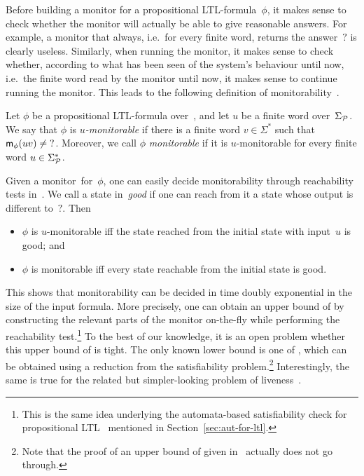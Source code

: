 \noindent
Before building a monitor for a propositional LTL-formula~$\phi$, it makes sense
to check whether the monitor will actually be able to give reasonable answers.
For example, a monitor that always, i.e.~for every finite word, returns the
answer~${?}$ is clearly useless.  Similarly, when running the monitor, it makes
sense to check whether, according to what has been seen of the system's
behaviour until now, i.e.~the finite word read by the monitor until now, it
makes sense to continue running the monitor.  This leads to the following
definition of monitorability~\cite{PnZa-FM06,FaFM-RV09,Bau-CoRR10}.

\begin{definition}[Monitorability]\label{def:monitorability-ltl}
    Let $\phi$ be a propositional LTL-formula over~\Pmc, and let $u$ be a finite
    word over~$\Sigma_\mathcal{P}$.  We say that $\phi$ is \emph{$u$-monitorable} if
    there is a finite word $v\in\Sigma^*$ such that $\mathsf{m}_\phi(uv)\ne{?}$.
    Moreover, we call $\phi$ \emph{monitorable} if it is $u$-monitorable for
    every finite word $u\in\Sigma_\mathcal{P}^*$.
\end{definition}

\noindent
Given a monitor~\Mmc for~$\phi$, one can easily decide monitorability through
reachability tests in~\Mmc.  We call a state in~\Mmc \emph{good} if one can
reach from it a state whose output is different to~${?}$.  Then
\begin{itemize}
    \item $\phi$ is $u$-monitorable iff the state reached from the initial state
        with input~$u$ is good; and
    \item $\phi$ is monitorable iff every state reachable from the initial state
        is good.
\end{itemize}
%
This shows that monitorability can be decided in time doubly exponential in the
size of the input formula.  More precisely, one can obtain an upper bound of
\ExpSpace by constructing the relevant parts of the monitor on-the-fly while
performing the reachability test.\footnote{%
    This is the same idea underlying the automata-based \PSpace satisfiability
    check for propositional LTL~\cite{SiCl-JACM85,LiPZ-CLP85} mentioned in
    Section~\ref{sec:aut-for-ltl}.}
%
To the best of our knowledge, it is an open problem whether this upper
bound of \ExpSpace is tight.  The only known lower
bound is one of \PSpace, which can be obtained using a reduction from the
satisfiability problem.\footnote{%
    Note that the proof of an upper bound of \PSpace given in~\cite{Bau-CoRR10}
    actually does not go through.}
%
Interestingly, the same is true for the related but simpler-looking problem of
liveness~\cite{AlSc-IPL85}.

